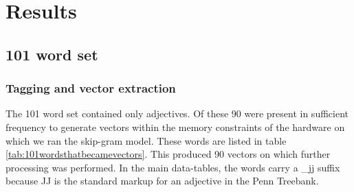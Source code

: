 \documentclass[eric_thesis.tex]{subfiles}
\begin{document}
\chapter{Results}

\section{101 word set}

\subsection{Tagging and vector extraction}

The 101 word set contained only adjectives. Of these 90 were present in 
sufficient frequency to generate vectors within the memory constraints of the 
hardware on which we ran the skip-gram model. These words are listed in table 
\ref{tab:101wordsthatbecamevectors}. This produced 90 vectors on which further 
processing was performed. In the main data-tables, the words carry a \_jj suffix
because JJ is the standard markup for an adjective in the Penn Treebank.
\end{document}
